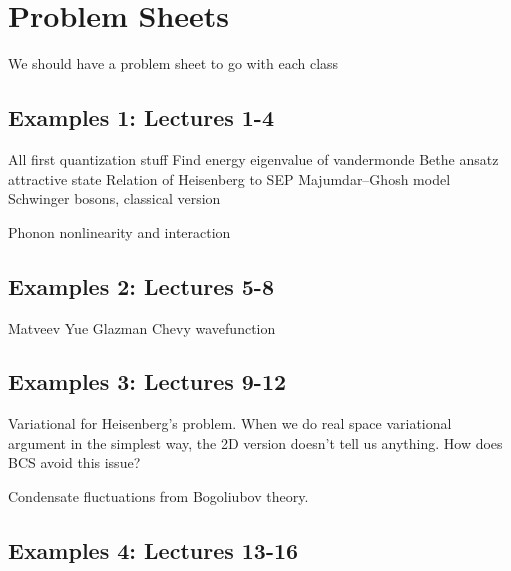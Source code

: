 \section{Problem Sheets}


We should have a problem sheet to go with each class

\subsection{Examples 1: Lectures 1-4}

All first quantization stuff
Find energy eigenvalue of vandermonde
Bethe ansatz attractive state
Relation of Heisenberg to SEP
Majumdar--Ghosh model
Schwinger bosons, classical version

Phonon nonlinearity and interaction

\subsection{Examples 2: Lectures 5-8}

Matveev Yue Glazman
Chevy wavefunction

\subsection{Examples 3: Lectures 9-12}

Variational for Heisenberg's problem. When we do real space variational argument in the simplest way, the 2D version doesn't tell us anything. How does BCS avoid this issue?

Condensate fluctuations from Bogoliubov theory.

\subsection{Examples 4: Lectures 13-16}



